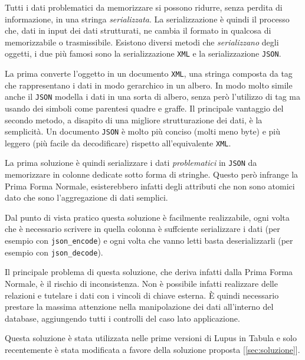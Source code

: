 Tutti i dati problematici da memorizzare si possono ridurre, senza perdita di informazione, in una stringa \emph{serializzata}. La serializzazione è quindi il processo che, dati in input dei dati strutturati, ne cambia il formato in qualcosa di memorizzabile o trasmissibile. Esistono diversi metodi che \emph{serializzano} degli oggetti, i due più famosi sono la serializzazione \texttt{XML} e la serializzazione \texttt{JSON}. 

La prima converte l'oggetto in un documento \texttt{XML}, una stringa composta da tag che rappresentano i dati in modo gerarchico in un albero. In modo molto simile anche il \texttt{JSON} modella i dati in una sorta di albero, senza però l'utilizzo di tag ma usando dei simboli come parentesi quadre e graffe. Il principale vantaggio del secondo metodo, a disapito di una migliore strutturazione dei dati, è la semplicità. Un documento \texttt{JSON} è molto più conciso (molti meno byte) e più leggero (più facile da decodificare) rispetto all'equivalente \texttt{XML}.

La prima soluzione è quindi serializzare i dati \emph{problematici} in \texttt{JSON} da memorizzare in colonne dedicate sotto forma di stringhe. Questo però infrange la Prima Forma Normale, esisterebbero infatti degli attributi che non sono atomici dato che sono l'aggregazione di dati semplici.

Dal punto di vista pratico questa soluzione è facilmente realizzabile, ogni volta che è necessario scrivere in quella colonna è suffciente serializzare i dati (per esempio con \texttt{json\_encode}) e ogni volta che vanno letti basta deserializzarli (per esempio con \texttt{json\_decode}).

Il principale problema di questa soluzione, che deriva infatti dalla Prima Forma Normale, è il rischio di inconsistenza. Non è possibile infatti realizzare delle relazioni e tutelare i dati con i vincoli di chiave esterna. È quindi necessario prestare la massima attenzione nella manipolazione dei dati all'interno del database, aggiungendo tutti i controlli del caso lato applicazione.

Questa soluzione è stata utilizzata nelle prime versioni di Lupus in Tabula e solo recentemente è stata modificata a favore della soluzione proposta [\ref{sec:soluzione}].